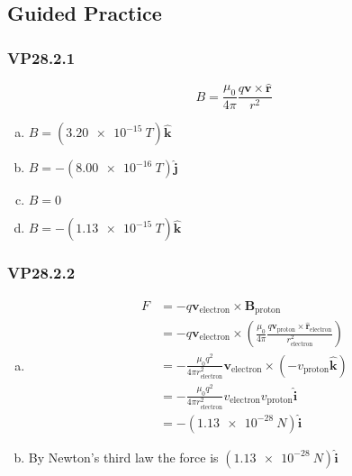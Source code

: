 \documentclass{article}
\begin{document}
\subsection{Guided Practice}

\subsubsection{VP28.2.1}

\[B = \frac{\mu_0}{4 \pi} \frac{q \mathbf{v} \times \hat{\mathbf{r}}}{r^2}\]

\begin{enumerate}[(a)]
  \item $B = (\qty{3.20e-15}{T}) \hat{\mathbf{k}}$

  \item $B = -(\qty{8.00e-16}{T}) \hat{\mathbf{j}}$

  \item $B = 0$

  \item $B = -(\qty{1.13e-15}{T}) \hat{\mathbf{k}}$
\end{enumerate}

\subsubsection{VP28.2.2}

\begin{enumerate}[(a)]
  \item

        \begin{align*}
          F & = -q \mathbf{v}_\textrm{electron} \times \mathbf{B}_\textrm{proton}                                                                                                              \\
            & = -q \mathbf{v}_\textrm{electron} \times \left( \frac{\mu_0}{4 \pi} \frac{q \mathbf{v}_\textrm{proton} \times \hat{\mathbf{r}}_\textrm{electron}}{r_\textrm{electron}^2} \right) \\
            & = -\frac{\mu_0 q^2}{4 \pi r_\textrm{electron}^2} \mathbf{v}_\textrm{electron} \times \left( -v_\textrm{proton} \hat{\mathbf{k}} \right)                                          \\
            & = -\frac{\mu_0 q^2}{4 \pi r_\textrm{electron}^2} v_\textrm{electron} v_\textrm{proton} \hat{\mathbf{i}}                                                                          \\
            & = -(\qty{1.13e-28}{N}) \hat{\mathbf{i}}
        \end{align*}

  \item By Newton's third law the force is $(\qty{1.13e-28}{N}) \hat{\mathbf{i}}$
\end{enumerate}
\end{document}
